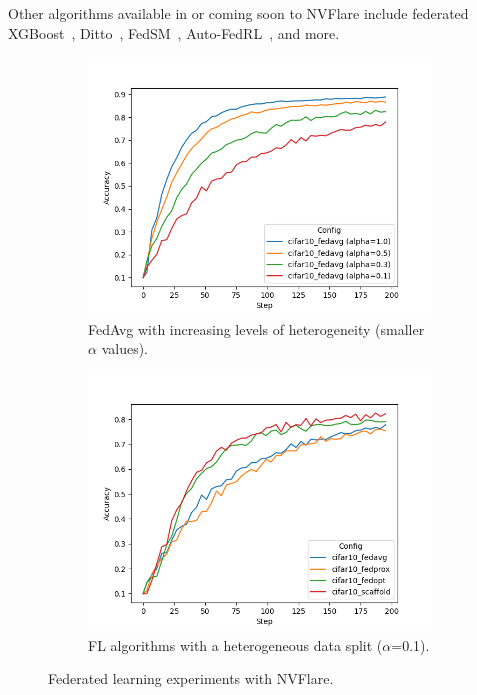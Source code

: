 \documentclass[11pt]{article}
\begin{document}
Other algorithms available in or coming soon to NVFlare include federated XGBoost~\cite{Chen:2016:XST:2939672.2939785}, Ditto~\cite{li2021ditto}, FedSM~\cite{xu2022closing}, Auto-FedRL~\cite{guo2022auto}, and more.
\begin{figure}[htbp]
\centering
\begin{subfigure}[t]{0.45\textwidth}
    \includegraphics[width=\textwidth]{fig/fedavg_alpha.png}
    \caption{\footnotesize FedAvg with increasing levels of heterogeneity (smaller $\alpha$ values). \label{fig:fl_alpha}}
\end{subfigure}\qquad
\begin{subfigure}[t]{0.45\textwidth}
    \includegraphics[width=\textwidth]{fig/fedopt_fedprox_scaffold.png}
    \caption{\footnotesize FL algorithms with a heterogeneous data split ($\alpha$=0.1). \label{fig:fl_algos}}
\end{subfigure}
\caption{Federated learning experiments with NVFlare. \label{fig:fl}}
\end{figure}
\end{document}
